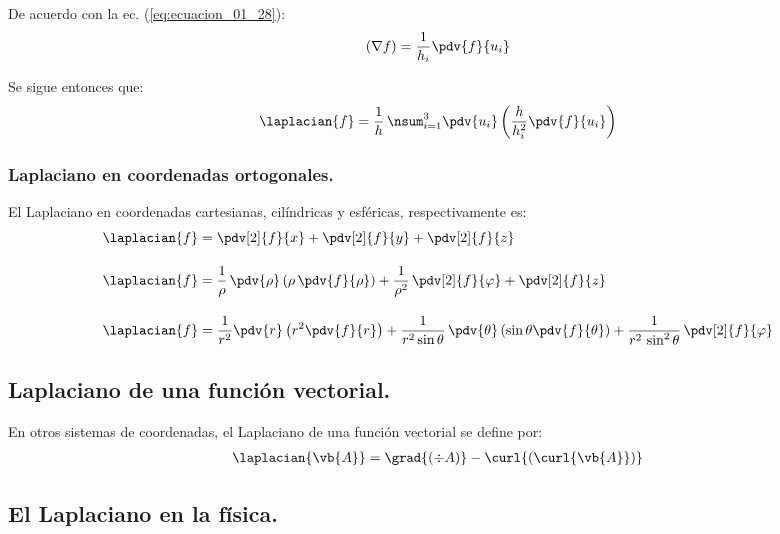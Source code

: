 De acuerdo con la ec. (\ref{eq:ecuacion_01_28}):
\begin{align*}
(\nabla f) = \dfrac{1}{h_{i}} \pdv{f}{u_{i}}
\end{align*}

Se sigue entonces que:
\begin{align}
\laplacian{f} = \dfrac{1}{h} \, \nsum_{i=1}^{3} \pdv{u_{i}} \left( \dfrac{h}{h_{i}^{2}}  \pdv{f}{u_{i}} \right)
\label{eq:ecuacion_01_36}
\end{align}

\subsubsection{Laplaciano en coordenadas ortogonales.}

El Laplaciano en coordenadas cartesianas, cilíndricas y esféricas, respectivamente es:
\begin{align}
\laplacian{f} &= \pdv[2]{f}{x} + \pdv[2]{f}{y} + \pdv[2]{f}{z} \label{eq:laplaciano_cartesianas} \\[1em]
\laplacian{f} &= \dfrac{1}{\rho} \, \pdv{\rho} \left( \rho \, \pdv{f}{\rho} \right) + \dfrac{1}{\rho^{2}} \, \pdv[2]{f}{\varphi} + \pdv[2]{f}{z} \label{eq:laplaciano_cilindricas}\\[1em]
\laplacian{f} &= \dfrac{1}{r^{2}} \pdv{r} \left( r^{2} \pdv{f}{r} \right) + \dfrac{1}{r^{2} \sin \theta} \, \pdv{\theta} \left( \sin \theta \pdv{f}{\theta} \right) + \dfrac{1}{r^{2} \, \sin^{2} \theta} \, \pdv[2]{f}{\varphi} \label{eq:laplaciano_esfericas}
\end{align}

\subsection{Laplaciano de una función vectorial.}

En otros sistemas de coordenadas, el Laplaciano de una función vectorial se define por:
\begin{align*}
\laplacian{\vb{A}} = \grad{(\div{A})} - \curl{(\curl{\vb{A}})}
\end{align*}

\subsection{El Laplaciano en la física.}

